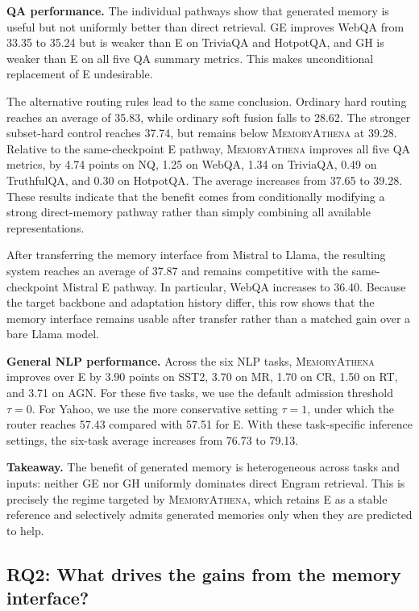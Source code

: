 \documentclass{article}
\newcommand{\takeaway}[1]{%
  \par\smallskip\noindent\begingroup
  \setlength{\fboxsep}{6pt}%
  \colorbox{harmonyblue!55}{\parbox{\dimexpr\linewidth-2\fboxsep\relax}{\textbf{Takeaway.} #1}}%
  \endgroup\par\smallskip}
\begin{document}
\textbf{QA performance.}
The individual pathways show that generated memory is useful but not uniformly
better than direct retrieval. GE improves WebQA from 33.35 to 35.24 but is
weaker than E on TriviaQA and HotpotQA, and GH is weaker than E on all five QA
summary metrics. This makes unconditional replacement of E undesirable.

The alternative routing rules lead to the same conclusion. Ordinary hard
routing reaches an average of 35.83, while ordinary soft fusion falls to 28.62.
The stronger subset-hard control reaches 37.74, but remains below
\textsc{MemoryAthena} at 39.28. Relative to the same-checkpoint E pathway,
\textsc{MemoryAthena} improves all five QA metrics, by 4.74 points on NQ,
1.25 on WebQA, 1.34 on TriviaQA, 0.49 on TruthfulQA, and 0.30 on HotpotQA.
The average increases from 37.65 to 39.28. These results indicate that the
benefit comes from conditionally modifying a strong direct-memory pathway rather
than simply combining all available representations.

After transferring the memory interface from Mistral to Llama, the resulting
system reaches an average of 37.87 and remains competitive with the
same-checkpoint Mistral E pathway. In particular, WebQA increases to 36.40.
Because the target backbone and adaptation history differ, this row shows that the memory interface remains usable after transfer rather than a matched gain over a bare Llama model.

\textbf{General NLP performance.}
Across the six NLP tasks, \textsc{MemoryAthena} improves over E by
3.90 points on SST2, 3.70 on MR, 1.70 on CR, 1.50 on RT, and 3.71 on AGN.
For these five tasks, we use the default admission threshold $\tau=0$.
For Yahoo, we use the more conservative setting $\tau=1$, under which the
router reaches 57.43 compared with 57.51 for E.
With these task-specific inference settings, the six-task average increases
from 76.73 to 79.13.

\takeaway{
The benefit of generated memory is heterogeneous across tasks and inputs:
neither GE nor GH uniformly dominates direct Engram retrieval. This is precisely
the regime targeted by \textsc{MemoryAthena}, which retains E as a stable
reference and selectively admits generated memories only when they are
predicted to help.
}
\subsection{RQ2: What drives the gains from the memory interface?}
\end{document}
